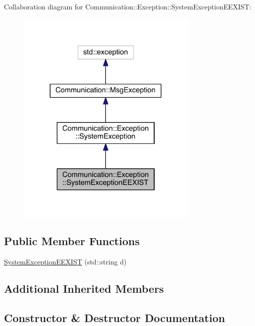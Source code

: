 Collaboration diagram for Communication\+:\+:Exception\+:\+:System\+Exception\+E\+E\+X\+I\+S\+T\+:\nopagebreak
\begin{figure}[H]
\begin{center}
\leavevmode
\includegraphics[width=248pt]{class_communication_1_1_exception_1_1_system_exception_e_e_x_i_s_t__coll__graph}
\end{center}
\end{figure}
\subsection*{Public Member Functions}
\begin{DoxyCompactItemize}
\item 
\hyperlink{class_communication_1_1_exception_1_1_system_exception_e_e_x_i_s_t_a0ece4bd08a3a0d5650c0a361a509d5fc}{System\+Exception\+E\+E\+X\+I\+S\+T} (std\+::string d)
\end{DoxyCompactItemize}
\subsection*{Additional Inherited Members}


\subsection{Constructor \& Destructor Documentation}
\hypertarget{class_communication_1_1_exception_1_1_system_exception_e_e_x_i_s_t_a0ece4bd08a3a0d5650c0a361a509d5fc}{}
